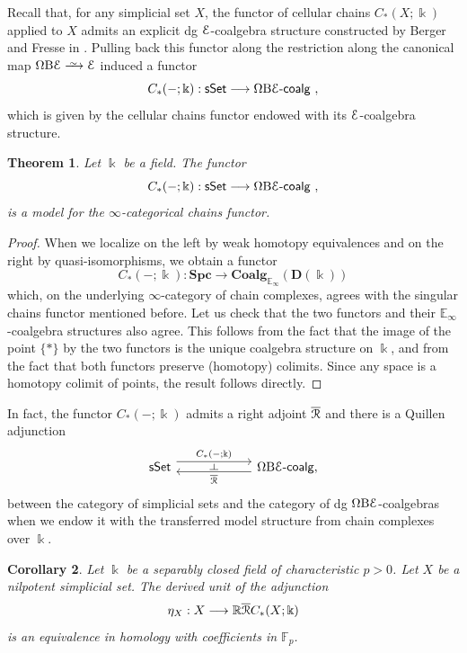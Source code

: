 \documentclass[a4paper,12pt]{amsart}
\renewcommand{\mathcal}{\EuScript}
\theoremstyle{plain}
\newtheorem{theorem}{Theorem}[section]
\newtheorem{corollary}[theorem]{Corollary}%
\theoremstyle{definition}
\theoremstyle{remark}
\newcommand{\qi}{\xrightarrow{ \,\smash{\raisebox{-0.65ex}{\ensuremath{\scriptstyle\sim}}}\,}}
\newcommand{\kk}{\Bbbk}
\begin{document}
Recall that, for any simplicial set $X$, the functor of cellular chains $C_*(X; \kk)$ applied to $X$ admits an explicit dg $\mathcal{E}$-coalgebra structure constructed by Berger and Fresse in \cite{BergerFresse}. Pulling back this functor along the restriction along the canonical map $\Omega \mathrm{B} \mathcal{E} \qi \mathcal{E}$ induced a functor 
\[
C_*(-;\kk): \mathsf{sSet} \longrightarrow \Omega \mathrm{B} \mathcal{E}\text{-}\mathsf{coalg}~, 
\]
which is given by the cellular chains functor endowed with its $\mathcal{E}$-coalgebra structure. 

\begin{theorem}\label{thm: point-set model for the chains functor}
Let $\kk$ be a field. The functor 
\[
C_*(-;\kk): \mathsf{sSet} \longrightarrow \Omega \mathrm{B} \mathcal{E}\text{-}\mathsf{coalg}~, 
\]
is a model for the $\infty$-categorical chains functor. 
\end{theorem}
 
\begin{proof}
When we localize on the left by weak homotopy equivalences and on the right by quasi-isomorphisms, we obtain a functor 
\[
C_*(-;\kk): \mathbf{Spc} \longrightarrow \mathbf{Coalg}_{\mathbb{E}_\infty}(\mathbf{D}(\kk)) 
\]
which, on the underlying $\infty$-category of chain complexes, agrees with the singular chains functor mentioned before. Let us check that the two functors and their $\mathbb{E}_\infty$-coalgebra structures also agree. This follows from the fact that the image of the point $\{*\}$ by the two functors is the unique coalgebra structure on $\kk$, and from the fact that both functors preserve (homotopy) colimits. Since any space is a homotopy colimit of points, the result follows directly. 
\end{proof}

In fact, the functor $C_*(-;\kk)$ admits a right adjoint $\overline{\mathcal{R}}$ and there is a Quillen adjunction 
\[
\begin{tikzcd}[column sep=5pc,row sep=3pc]
         \mathsf{sSet} \arrow[r, shift left=1.1ex, "C_*(-;\kk)"{name=F}] &\Omega \mathrm{B} \mathcal{E}\text{-}\mathsf{coalg}, \arrow[l, shift left=.75ex, "\overline{\mathcal{R}}"{name=U}]
            \arrow[phantom, from=F, to=U, , "\dashv" rotate=-90]
\end{tikzcd}
\]
between the category of simplicial sets and the category of dg $\Omega\mathrm{B}\mathcal{E}$-coalgebras when we endow it with the transferred model structure from chain complexes over $\kk$. 

\begin{corollary}\label{cor: derived unit is an Fp equivalence}
Let $\kk$ be a separably closed field of characteristic $p >0$. Let $X$ be a nilpotent simplicial set. The derived unit of the adjunction 
\[
\eta_X: X \longrightarrow \mathbb{R}\overline{\mathcal{R}}C_*(X;\kk)
\]
is an equivalence in homology with coefficients in $\mathbb{F}_p$. 
\end{corollary}
\end{document}
